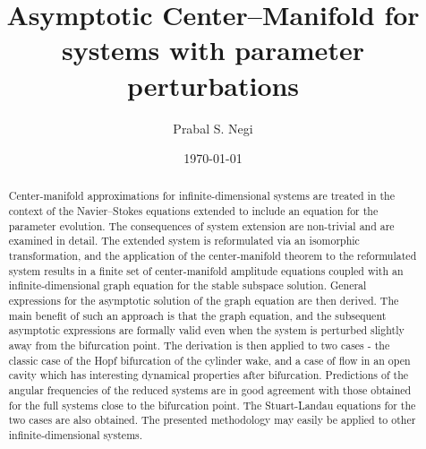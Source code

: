 \documentclass[aps,prr,twocolumn,groupedaddress]{revtex4-2}
\begin{document}
	
\title{Asymptotic Center--Manifold for systems with parameter perturbations}
\author{Prabal S. Negi}

\date{\today}

\begin{abstract}
Center-manifold approximations for infinite-dimensional systems are treated in the context of the Navier--Stokes equations extended to include an equation for the parameter evolution. The consequences of system extension are non-trivial and are examined in detail. The extended system is reformulated via an isomorphic transformation, and the application of the center-manifold theorem to the reformulated system results in a finite set of center-manifold amplitude equations coupled with an infinite-dimensional graph equation for the stable subspace solution. General expressions for the asymptotic solution of the graph equation are then derived. The main benefit of such an approach is that the graph equation, and the subsequent asymptotic expressions are formally valid even when the system is perturbed slightly away from the bifurcation point. The derivation is then applied to two cases - the classic case of the Hopf bifurcation of the cylinder wake, and a case of flow in an open cavity which has interesting dynamical properties after bifurcation. Predictions of the angular frequencies of the reduced systems are in good agreement with those obtained for the full systems close to the bifurcation point. The Stuart-Landau equations for the two cases are also obtained. The presented methodology may easily be applied to other infinite-dimensional systems. 
\end{abstract}

\maketitle

%

%
%


\FloatBarrier



\end{document}
